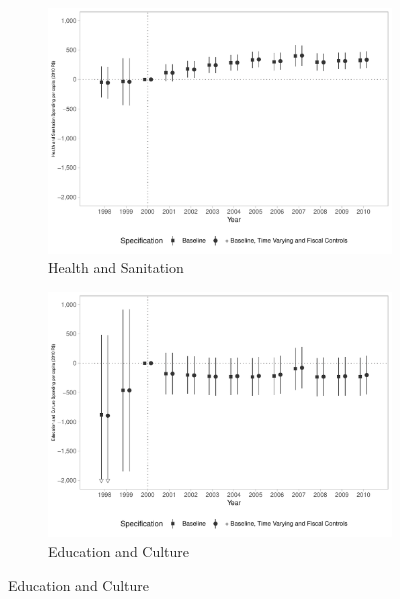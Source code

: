 \begin{figure}[h!]
    \begin{center}
    \caption{Effects on Public Spending per capita - By Category}\label{fig:8}
    \begin{subfigure}{0.48\textwidth}
        \caption{\scriptsize Health and Sanitation}\label{fig:8a}
        \centering
        \includegraphics[width=\textwidth]{plots/finbra_desp_saude_san_pcapita_dist_ec29_baseline_dist_ec29_baseline_8.pdf}
    \end{subfigure}
    \begin{subfigure}{0.48\textwidth}
        \centering
        \caption{\scriptsize Education and Culture}\label{fig:8b}
        \includegraphics[width=\textwidth]{plots/finbra_desp_educ_cultura_pcapita_dist_ec29_baseline_dist_ec29_baseline_8.pdf}

\end{subfigure}
\end{center}
\end{figure}
